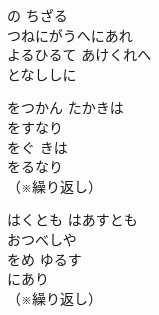\documentclass[10pt,b5j]{tarticle} %
\begin{document}
\vspace{1.5em} %
\newcommand{\linespace}{0.5em} %
\newcommand{\blocksize}{0.33\hsize} %
\begin{enumerate} %
    \begin{minipage}[c]{\blocksize}
    
        \vspace{\linespace}
        \item
        の
        ちざる\\
        つねにがうへにあれ\\
        よるひるて
        あけくれへ\\
        となししに\\
        
    \end{minipage}
    \begin{minipage}[c]{\blocksize}

        \vspace{\linespace}
        \item
        をつかん
        たかきは\\
        をすなり\\
        をぐ
        きは\\
        をるなり\\
        （※繰り返し）
        
    \end{minipage}
    \begin{minipage}[c]{\blocksize}
        
        \vspace{\linespace}
        \item
        はくとも
        はあすとも\\
        おつべしや\\
        をめ
        ゆるす\\
        にあり\\
        （※繰り返し）


\end{minipage}
\end{enumerate}
\end{document}
